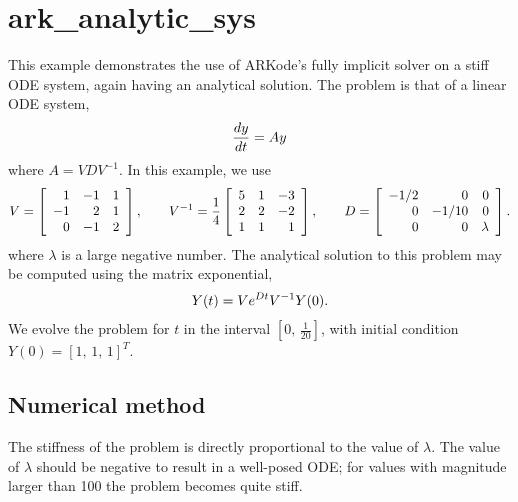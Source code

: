 \documentclass[letterpaper,10pt,english]{sphinxmanual}
\begin{document}
\section{ark\_analytic\_sys}
\label{cpp_serial:ark-analytic-sys}\label{cpp_serial:id1}
This example demonstrates the use of ARKode's fully implicit solver on
a stiff ODE system, again having an analytical solution.  The problem
is that of a linear ODE system,
\begin{gather}
\begin{split}\frac{dy}{dt} = Ay\end{split}\notag
\end{gather}
where \(A = V D V^{-1}\).  In this example, we use
\begin{gather}
\begin{split}V = \left[\begin{array}{rrr} 1 & -1 & 1\\ -1 & 2 & 1\\ 0 & -1 & 2
    \end{array}\right], \qquad
V^{-1} = \frac14 \left[\begin{array}{rrr} 5 & 1 & -3\\ 2 & 2 & -2\\
    1 & 1 & 1 \end{array}\right], \qquad
D = \left[\begin{array}{rrr} -1/2 & 0 & 0\\ 0 & -1/10 & 0\\ 0 & 0 &
    \lambda \end{array}\right].\end{split}\notag
\end{gather}
where \(\lambda\) is a large negative number. The analytical
solution to this problem may be computed using the matrix exponential,
\begin{gather}
\begin{split}Y(t) = V e^{Dt} V^{-1} Y(0).\end{split}\notag
\end{gather}
We evolve the problem for \(t\) in the interval \(\left[0,\,
\frac{1}{20}\right]\), with initial condition \(Y(0) = \left[1,\,
1,\, 1\right]^T\).


\subsection{Numerical method}
\label{cpp_serial:numerical-method}
The stiffness of the problem is directly proportional to the
value of \(\lambda\).  The value of \(\lambda\) should be
negative to result in a well-posed ODE; for values with magnitude
larger than 100 the problem becomes quite stiff.
\end{document}

